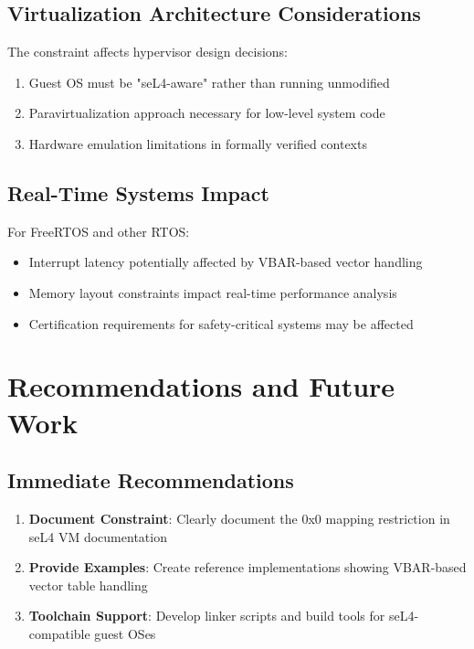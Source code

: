 \documentclass[11pt,a4paper]{article}
\begin{document}
\subsection{Virtualization Architecture Considerations}

The constraint affects hypervisor design decisions:

\begin{enumerate}
    \item Guest OS must be "seL4-aware" rather than running unmodified
    \item Paravirtualization approach necessary for low-level system code
    \item Hardware emulation limitations in formally verified contexts
\end{enumerate}

\subsection{Real-Time Systems Impact}

For FreeRTOS and other RTOS:

\begin{itemize}
    \item Interrupt latency potentially affected by VBAR-based vector handling
    \item Memory layout constraints impact real-time performance analysis
    \item Certification requirements for safety-critical systems may be affected
\end{itemize}

\section{Recommendations and Future Work}

\subsection{Immediate Recommendations}

\begin{enumerate}
    \item \textbf{Document Constraint}: Clearly document the 0x0 mapping restriction in seL4 VM documentation
    \item \textbf{Provide Examples}: Create reference implementations showing VBAR-based vector table handling
    \item \textbf{Toolchain Support}: Develop linker scripts and build tools for seL4-compatible guest OSes
\end{enumerate}
\end{document}
